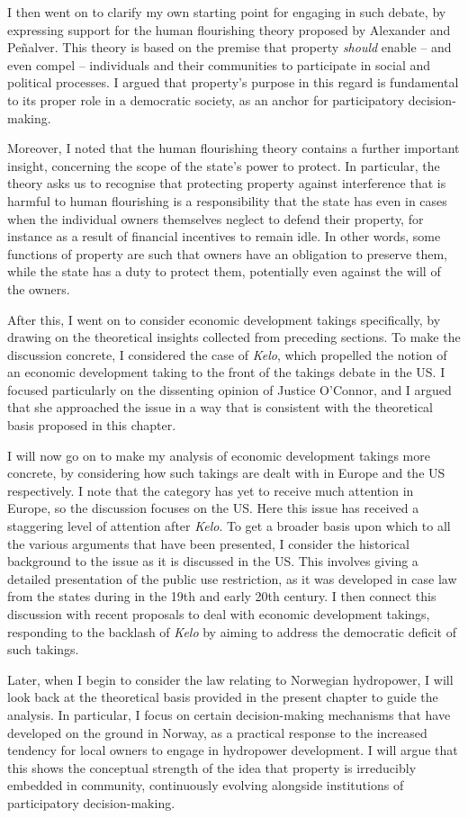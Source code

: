 I then went on to clarify my own starting point for engaging in such debate, by expressing support for the human flourishing theory proposed by Alexander and Pe\~{n}alver. This theory is based on the premise that property {\it should} enable -- and even compel -- individuals and their communities to  participate in social and political processes. I argued that property's purpose in this regard is  fundamental to its proper role in a democratic society, as an anchor for participatory decision-making.  

Moreover, I noted that the human flourishing theory contains a further important insight, concerning the scope of the state's power to protect. In particular, the theory asks us to recognise that protecting property against interference that is harmful to human flourishing is a responsibility that the state has even in cases when the individual owners themselves neglect to defend their property, for instance as a result of financial incentives to remain idle. In other words, some functions of property are such that owners have an obligation to preserve them, while the state has a duty to protect them, potentially even against the will of the owners.

After this, I went on to consider economic development takings specifically, by drawing on the theoretical insights collected from preceding sections. To make the discussion concrete, I considered the case of {\it Kelo}, which propelled the notion of an economic development taking to the front of the takings debate in the US. I focused particularly on the dissenting opinion of Justice O'Connor, and I argued that she approached the issue in a way that is consistent with the theoretical basis proposed in this chapter.

I will now go on to make my analysis of economic development takings more concrete, by considering how such takings are dealt with in Europe and the US respectively. I note that the category has yet to receive much attention in Europe, so the discussion focuses on the US. Here this issue has received a staggering level of attention after {\it Kelo}. To get a broader basis upon which to  all the various arguments that have been presented, I consider the historical background to the issue as it is discussed in the US. This involves giving a detailed presentation of the public use restriction, as it was developed in case law from the states during in the 19th and early 20th century. I then connect this discussion with recent proposals to deal with economic development takings, responding to the backlash of {\it Kelo} by aiming to address the democratic deficit of such takings.

Later, when I begin to consider the law relating to Norwegian hydropower, I will look back at the theoretical basis provided in the present chapter to guide the analysis. In particular, I focus on certain decision-making mechanisms that have developed on the ground in Norway, as a practical response to the increased tendency for local owners to engage in hydropower development. I will argue that this shows the conceptual strength of the idea that property is irreducibly embedded in community, continuously evolving alongside institutions of participatory decision-making.